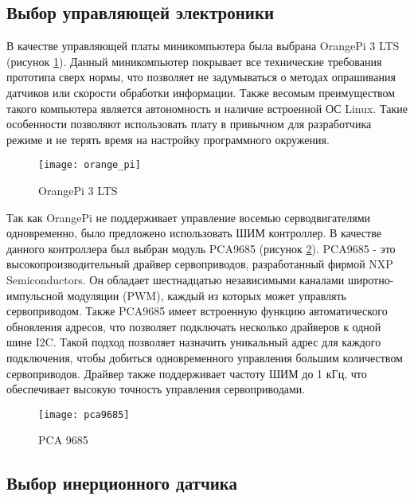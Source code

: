 \subsection{Выбор управляющей электроники}\label{C4_4_2}
	
В качестве управляющей платы миникомпьютера была выбрана OrangePi 3 LTS (рисунок \ref{orange_pi}). Данный миникомпьютер покрывает все технические требования прототипа сверх нормы, что позволяет не задумываться о методах опрашивания датчиков или скорости обработки информации. Также весомым преимуществом такого компьютера является автономность и наличие встроенной ОС Linux. Такие особенности позволяют использовать плату в привычном для разработчика режиме и не терять время на настройку программного окружения. 	
\begin{figure}[h!]
	\begin{center}
		\texttt{[image: orange\_pi]}
		\caption{OrangePi 3 LTS}
		\label{orange_pi}
	\end{center}
\end{figure}

Так как OrangePi не поддерживает управление восемью серводвигателями одновременно, было предложено использовать ШИМ контроллер. В качестве данного контроллера был выбран модуль PCA9685 (рисунок \ref{pca9685}). PCA9685 - это высокопроизводительный драйвер сервоприводов, разработанный фирмой NXP Semiconductors. Он обладает шестнадцатью независимыми каналами широтно-импульсной модуляции (PWM), каждый из которых может управлять сервоприводом. Также PCA9685 имеет встроенную функцию автоматического обновления адресов, что позволяет подключать несколько драйверов к одной шине I2C. Такой подход позволяет назначить уникальный адрес для каждого подключения, чтобы добиться одновременного управления большим количеством сервоприводов. Драйвер также поддерживает частоту ШИМ до 1 кГц, что обеспечивает высокую точность управления сервоприводами.

\begin{figure}[h!]
	\begin{center}
		\texttt{[image: pca9685]}
		\caption{PCA 9685}
		\label{pca9685}
	\end{center}
\end{figure}

\subsection{Выбор инерционного датчика}\label{C4_4_3}

